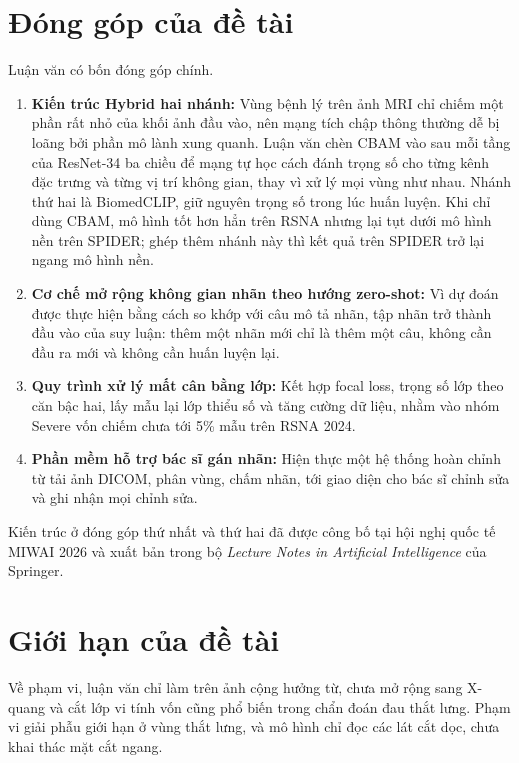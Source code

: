 \section{Đóng góp của đề tài}

Luận văn có bốn đóng góp chính.

\begin{enumerate}
    \item \textbf{Kiến trúc Hybrid hai nhánh:} Vùng bệnh lý trên ảnh MRI chỉ chiếm một phần rất nhỏ của khối ảnh đầu vào, nên mạng tích chập thông thường dễ bị loãng bởi phần mô lành xung quanh. Luận văn chèn CBAM vào sau mỗi tầng của ResNet-34 ba chiều để mạng tự học cách đánh trọng số cho từng kênh đặc trưng và từng vị trí không gian, thay vì xử lý mọi vùng như nhau. Nhánh thứ hai là BiomedCLIP, giữ nguyên trọng số trong lúc huấn luyện. Khi chỉ dùng CBAM, mô hình tốt hơn hẳn trên RSNA nhưng lại tụt dưới mô hình nền trên SPIDER; ghép thêm nhánh này thì kết quả trên SPIDER trở lại ngang mô hình nền.
    \item \textbf{Cơ chế mở rộng không gian nhãn theo hướng zero-shot:} Vì dự đoán được thực hiện bằng cách so khớp với câu mô tả nhãn, tập nhãn trở thành đầu vào của suy luận: thêm một nhãn mới chỉ là thêm một câu, không cần đầu ra mới và không cần huấn luyện lại.
    \item \textbf{Quy trình xử lý mất cân bằng lớp:} Kết hợp focal loss, trọng số lớp theo căn bậc hai, lấy mẫu lại lớp thiểu số và tăng cường dữ liệu, nhằm vào nhóm Severe vốn chiếm chưa tới 5\% mẫu trên RSNA 2024.
    \item \textbf{Phần mềm hỗ trợ bác sĩ gán nhãn:} Hiện thực một hệ thống hoàn chỉnh từ tải ảnh DICOM, phân vùng, chấm nhãn, tới giao diện cho bác sĩ chỉnh sửa và ghi nhận mọi chỉnh sửa.
\end{enumerate}

Kiến trúc ở đóng góp thứ nhất và thứ hai đã được công bố tại hội nghị quốc tế MIWAI 2026 và xuất bản trong bộ \textit{Lecture Notes in Artificial Intelligence} của Springer.

\section{Giới hạn của đề tài}

Về phạm vi, luận văn chỉ làm trên ảnh cộng hưởng từ, chưa mở rộng sang X-quang và cắt lớp vi tính vốn cũng phổ biến trong chẩn đoán đau thắt lưng. Phạm vi giải phẫu giới hạn ở vùng thắt lưng, và mô hình chỉ đọc các lát cắt dọc, chưa khai thác mặt cắt ngang.

